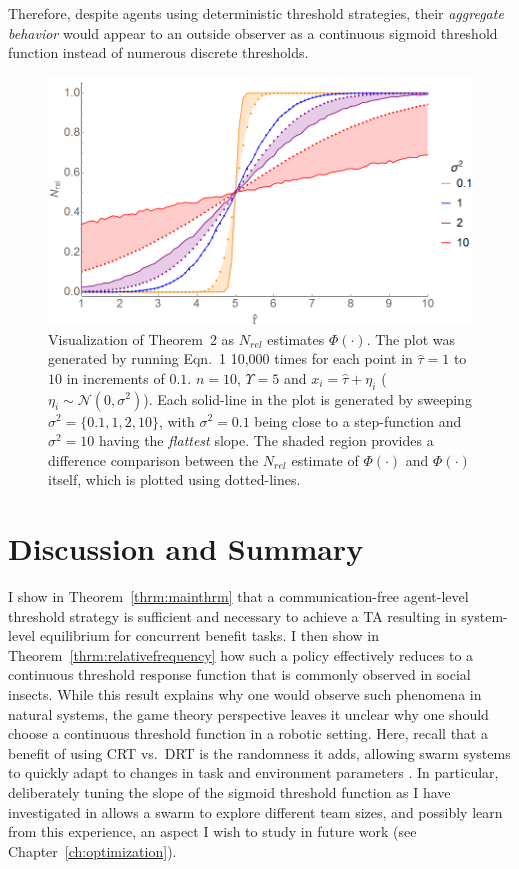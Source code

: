 \documentclass[defaultstyle,12pt]{thesis}
\newcommand{\td}{\Upsilon}   %
\begin{document}
Therefore, despite agents using deterministic threshold strategies, their \emph{aggregate behavior} would appear to an outside observer as a continuous sigmoid threshold function instead of numerous discrete thresholds.
\begin{figure}[!ht]
	\centering\includegraphics[width=0.6\columnwidth]{../assets/thm2fig.png}
	\centering\caption{Visualization of Theorem~2 as $N_{rel}$ estimates $\Phi(\cdot)$. The plot was generated by running Eqn.~1 10,000 times for each point in $\hat{\tau} = 1$ to $10$ in increments of $0.1$. $n = 10$, $\td = 5$ and $x_i = \hat{\tau} + \eta_i$ ($\eta_i \sim\mathcal{N}(0, \sigma^2)$). Each solid-line in the plot is generated by sweeping $\sigma^2 = \{0.1, 1, 2, 10\}$, with $\sigma^2 = 0.1$ being close to a step-function and $\sigma^2 = 10$ having the \emph{flattest} slope. The shaded region provides a difference comparison between the $N_{rel}$ estimate of $\Phi(\cdot)$ and $\Phi(\cdot)$ itself, which is plotted using dotted-lines.}\label{fig:thm2fig}
\end{figure}

\section{Discussion and Summary}\label{sec:discsum}
I show in Theorem~\ref{thrm:mainthrm} that a communication-free agent-level threshold strategy is sufficient and necessary to achieve a TA resulting in system-level equilibrium for concurrent benefit tasks. I then show in Theorem~\ref{thrm:relativefrequency} how such a policy effectively reduces to a continuous threshold response function that is commonly observed in social insects. While this result explains why one would observe such phenomena in natural systems, the game theory perspective leaves it unclear why one should choose a continuous threshold function in a robotic setting. Here, recall that a benefit of using CRT vs.~DRT is the randomness it adds, allowing swarm systems to quickly adapt to changes in task and environment parameters \cite{Bonabeau1997}. In particular, deliberately tuning the slope of the sigmoid threshold function as I have investigated in \cite{Kanakia2014} allows a swarm to explore different team sizes, and possibly learn from this experience, an aspect I wish to study in future work (see Chapter~\ref{ch:optimization}). 
\end{document}
